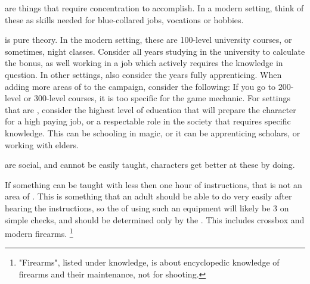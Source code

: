  are things that require concentration to accomplish.
In a modern setting, think of these as skills needed for blue-collared jobs, vocations or hobbies.

 is pure theory.
In the modern setting, these are 100-level university courses, or sometimes, night classes.
Consider all years studying in the university to calculate the bonus, as well working in a job which actively requires the knowledge in question.
In other settings, also consider the years fully apprenticing.
When adding more areas of  to the campaign, consider the following:
If you go to 200-level or 300-level courses, it is too specific for the game mechanic.
For settings that are , consider the highest level of
education that will prepare the character for a high paying job, or a respectable role in the society that requires specific knowledge.
This can be schooling in magic, or it can be apprenticing scholars, or working with elders.
\par
{} are social, and cannot be easily taught, characters get better at these by doing.\par

If something can be taught with less then one hour of instructions, that is not an area of .
This is something that an adult should be able to do very easily after hearing the instructions,
so the  of using such an equipment will likely be 3 on simple checks,
and should be determined only by the .
This includes crossbox and modern firearms.
\footnote{"Firearms", listed under knowledge, is about encyclopedic knowledge of firearms and their maintenance, not for shooting.}







